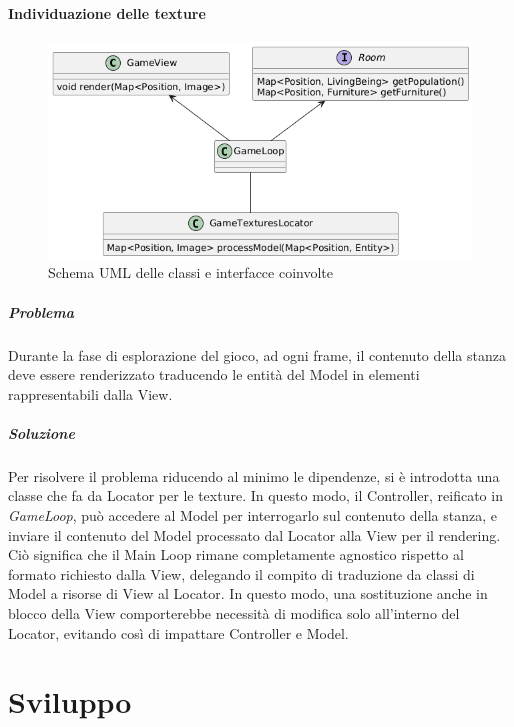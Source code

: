 \documentclass[a4paper,12pt]{report}
\begin{document}
\subsubsection{Individuazione delle texture}
\begin{figure}[H]
	\centering
	\includegraphics[width=\textwidth]{img/locator-game.png}
	\caption{Schema UML delle classi e interfacce coinvolte}
	\label{img:locator-game}
\end{figure}
\paragraph{Problema} Durante la fase di esplorazione del gioco, ad ogni frame, il contenuto della stanza deve essere renderizzato traducendo le entità del Model in elementi rappresentabili dalla View.
\paragraph{Soluzione} Per risolvere il problema riducendo al minimo le dipendenze, si è introdotta una classe che fa da Locator per le texture. In questo modo, il Controller, reificato in \textit{GameLoop}, può accedere al Model per interrogarlo sul contenuto della stanza, e inviare il contenuto del Model processato dal Locator alla View per il rendering. Ciò significa che il Main Loop rimane completamente agnostico rispetto al formato richiesto dalla View, delegando il compito di traduzione da classi di Model a risorse di View al Locator. In questo modo, una sostituzione anche in blocco della View comporterebbe necessità di modifica solo all'interno del Locator, evitando così di impattare Controller e Model.

\chapter{Sviluppo}
\end{document}
